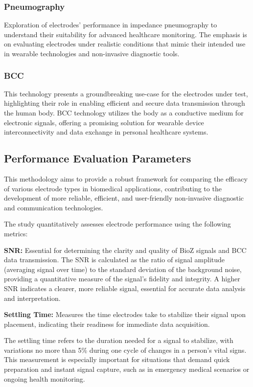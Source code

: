 \documentclass[conference]{IEEEtran}
\begin{document}
\subsubsection{Pneumography}
Exploration of electrodes' performance in impedance   pneumography to understand their suitability for advanced healthcare monitoring. The emphasis is on evaluating electrodes under realistic conditions that mimic their intended use in wearable technologies and non-invasive diagnostic tools.

\subsubsection{BCC}
This technology presents a groundbreaking use-case for the electrodes under test, highlighting their role in enabling efficient and secure data transmission through the human body. \gls{BCC} technology utilizes the body as a conductive medium for electronic signals, offering a promising solution for wearable device interconnectivity and data exchange in personal healthcare systems. 


\subsection{Performance Evaluation Parameters}
This methodology aims to provide a robust framework for comparing the efficacy of various electrode types in biomedical applications, contributing to the development of more reliable, efficient, and user-friendly non-invasive diagnostic and communication technologies. 

The study quantitatively assesses electrode performance using the following metrics:

 \textbf{\gls{SNR}:} Essential for determining the clarity and quality of \gls{BioZ} signals and \gls{BCC} data transmission.
    The \gls{SNR} is calculated as the ratio of signal amplitude (averaging signal over time) to the standard deviation of the background noise, providing a quantitative measure of the signal's fidelity and integrity. A higher \gls{SNR} indicates a clearer, more reliable signal, essential for accurate data analysis and interpretation.
    
\textbf{Settling Time:} Measures the time electrodes take to stabilize their signal upon placement, indicating their readiness for immediate data acquisition.
    
    The settling time refers to the duration needed for a signal to stabilize, with variations no more than 5\% during one cycle of changes in a person's vital signs. This measurement is especially important for situations that demand quick preparation and instant signal capture, such as in emergency medical scenarios or ongoing health monitoring.
    
\end{document}
